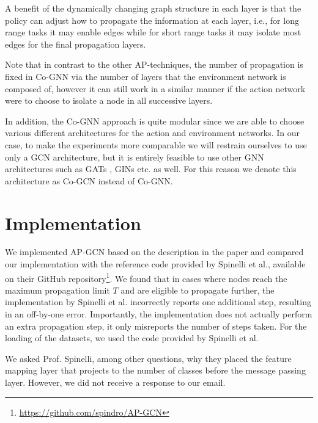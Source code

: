 \documentclass{gdl}
\begin{document}
A benefit of the dynamically changing graph structure in each layer is that the policy can adjust how to propagate the information at each layer, i.e., for long range tasks it may enable edges while for short range tasks it may isolate most edges for the final propagation layers. 

Note that in contrast to the other AP-techniques, the number of propagation is fixed in Co-GNN via the number of layers that the environment network is composed of, however it can still work in a similar manner if the action network were to choose to isolate a node in all successive layers.

In addition, the Co-GNN approach is quite modular since we are able to choose various different architectures for the action and environment networks. In our case, to make the experiments more comparable we will restrain ourselves to use only a GCN architecture, but it is entirely feasible to use other GNN architectures such as GATs \cite{veličković2018graphattentionnetworks}, GINs \cite{xu2019powerfulgraphneuralnetworks} etc. as well. For this reason we denote this architecture as Co-GCN instead of Co-GNN.

\section{Implementation}
We implemented AP-GCN based on the description in the paper and compared our implementation with the reference code provided by Spinelli et al., available on their GitHub repository\footnote{\url{https://github.com/spindro/AP-GCN}}. We found that in cases where nodes reach the maximum propagation limit $T$ and are eligible to propagate further, the implementation by Spinelli et al. incorrectly reports one additional step, resulting in an off-by-one error. Importantly, the implementation does not actually perform an extra propagation step, it only misreports the number of steps taken. For the loading of the datasets, we used the code provided by Spinelli et al.

We asked Prof. Spinelli, among other questions, why they placed the feature mapping layer that projects to the number of classes before the message passing layer. However, we did not receive a response to our email.
\end{document}
